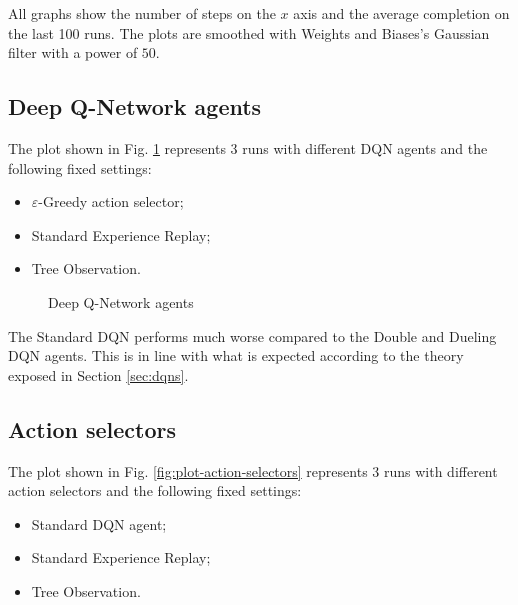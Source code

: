 \documentclass[a4paper, 12pt]{article}
\numberwithin{equation}{section}
\begin{document}
All graphs show the number of steps on the $x$ axis and the average completion on the last 100 runs. The plots are smoothed with Weights and Biases's Gaussian filter with a power of $50$.




\clearpage

\subsection{Deep Q-Network agents}

The plot shown in Fig. \ref{fig:plot-dqn} represents 3 runs with different DQN agents and the following fixed settings:
\begin{itemize}
	\item $\varepsilon$-Greedy action selector;
	\item Standard Experience Replay;
	\item Tree Observation.
\end{itemize}


\begin{figure}[H]
	\centering
		\caption{Deep Q-Network agents}
	\label{fig:plot-dqn}
\end{figure}

The Standard DQN performs much worse compared to the Double and Dueling DQN agents. This is in line with what is expected according to the theory exposed in Section \ref{sec:dqns}.


\clearpage

\subsection{Action selectors}

The plot shown in Fig. \ref{fig:plot-action-selectors} represents 3 runs with different action selectors and the following fixed settings:
\begin{itemize}
	\item Standard DQN agent;
	\item Standard Experience Replay;
	\item Tree Observation.
\end{itemize}
\end{document}
